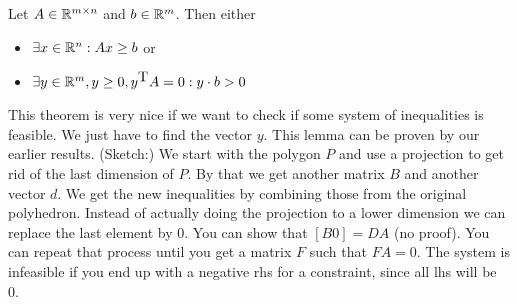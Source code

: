 \begin{thm} Let $A\in \mathbb{R}^{m\times n}$ and $b\in \mathbb{R}^m$. Then either 
\begin{itemize}
\item $\exists x\in \mathbb{R}^n: Ax\geq b$ or
\item $\exists y\in \mathbb{R}^m, y\geq 0, y^{\mbox{T}}A=0: y\cdot b>0$
\end{itemize}
\end{thm} 

This theorem is very nice if we want to check if some system of inequalities is feasible. We just have to find the vector $y$. This lemma can be proven by our earlier results. (Sketch:) We start with the polygon $P$ and use a projection to get rid of the last dimension of $P$. By that we get another matrix $B$ and another vector $d$. We get the new inequalities by combining those from the original polyhedron. Instead of actually doing the projection to a lower dimension we can replace the last element by 0. You can show that $[B0]=DA$ (no proof). You can repeat that process until you get a matrix $F$ such that $FA=0$. The system is infeasible if you end up with a negative rhs for a constraint, since all lhs will be 0.